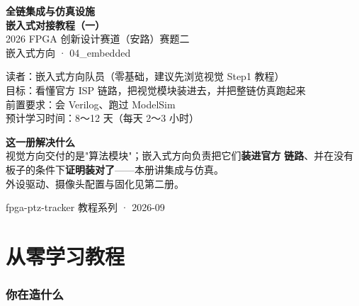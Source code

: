 \documentclass[11pt]{ctexart}
\begin{document}
\begin{titlepage}
\centering
\vspace*{2.2cm}
{\color{deep}\Huge\bfseries 全链集成与仿真设施}\\[6pt]
{\color{deep}\Large\bfseries 嵌入式对接教程（一）}\\[14pt]
{\large 2026 FPGA 创新设计赛道（安路）赛题二}\\[6pt]
{\large 嵌入式方向 · 04\_embedded}\\[20pt]

\begin{tcolorbox}[enhanced, colback=codebg, colframe=accent, boxrule=0.8pt,
  arc=2mm, width=12.5cm, left=4mm, right=4mm, top=3mm, bottom=3mm]
\centering
{\small 读者：嵌入式方向队员（零基础，建议先浏览视觉 Step1 教程）\\
目标：看懂官方 ISP 链路，把视觉模块装进去，并把整链仿真跑起来\\
前置要求：会 Verilog、跑过 ModelSim\\
预计学习时间：8～12 天（每天 2～3 小时）}
\end{tcolorbox}

\vspace{8mm}
\begin{tcolorbox}[enhanced, colback=tipbg, colframe=tipline, boxrule=0.5pt,
  arc=2mm, width=12.5cm, left=4mm, right=4mm, top=2mm, bottom=2mm]
\centering
{\small\color{deep} \textbf{这一册解决什么}\\
视觉方向交付的是"算法模块"；嵌入式方向负责把它们\textbf{装进官方}
\textbf{链路}、并在没有板子的条件下\textbf{证明装对了}——本册讲集成与仿真。\\
外设驱动、摄像头配置与固化见第二册。}
\end{tcolorbox}

\vfill
{\small\color{black!50} fpga-ptz-tracker 教程系列 · 2026-09}
\end{titlepage}

\tableofcontents
\newpage

\part{从零学习教程}

\section{你在造什么}
\end{document}
